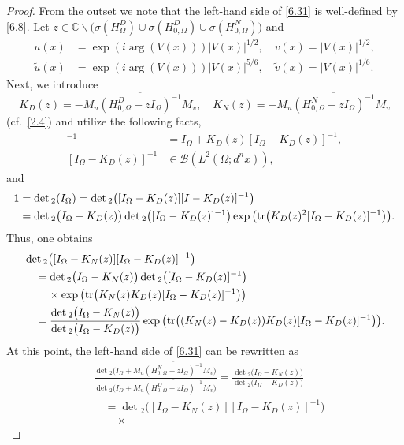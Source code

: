 \documentclass[reqno,10pt, centertags]{amsart}
\newcommand{\bbC}{{\mathbb{C}}}
\newcommand{\cB}{{\mathcal B}}
\newcommand{\abs}[1]{\left\lvert#1\right\rvert}
\newcommand{\no}{\nonumber}
\newcommand{\ol}{\overline}
\newcommand{\wti}{\widetilde}
\newcommand{\si}{\sigma}
\newcommand{\Om}{\Omega}
\newcommand{\tr}{\text{\rm{tr}}}
\numberwithin{equation}{section}
\theoremstyle{definition}
\begin{document}
\begin{proof}
From the outset we note that the left-hand side of \eqref{6.31} is
well-defined by \eqref{6.8}. Let $z\in\bbC\backslash\big(\si(H_{\Om}^D)\cup
\si(H_{0,\Om}^D) \cup \si(H_{0,\Om}^N)\big)$ and
\begin{align}
u(x) &= \exp(i\arg(V(x)))\abs{V(x)}^{1/2},\quad
v(x)=\abs{V(x)}^{1/2},
\\
\wti u(x) &= \exp(i\arg(V(x)))\abs{V(x)}^{5/6},\quad \wti
v(x)=\abs{V(x)}^{1/6}.
\end{align}
Next, we introduce
\begin{equation}
K_D(z)=-\ol{M_u(H_{0,\Om}^D-zI_{\Om})^{-1}M_v}, \quad
K_N(z)=-\ol{M_u(H_{0,\Om}^N-zI_{\Om})^{-1}M_v}
\end{equation}
(cf.\ \eqref{2.4}) and utilize the following facts,
\begin{align}
[I_{\Om}-K_D(z)]^{-1} &= I_{\Om} + K_D(z)[I_{\Om}-K_D(z)]^{-1},
\\
[I_{\Om}-K_D(z)]^{-1} &\in\cB(L^2(\Om;d^nx)),
\end{align}
and
\begin{align}
1& = \det{}_2(I_{\Om}) = \det{}_2\big([I_{\Om}-K_D(z)][I-K_D(z)]^{-1}\big)
\\
&= \det{}_2\big(I_{\Om}-K_D(z)\big)\det{}_2\big([I_{\Om}-K_D(z)]^{-1}\big)
\exp\big(\tr\big(K_D(z)^2[I_{\Om}-K_D(z)]^{-1}\big)\big).  \no
\end{align}
Thus, one obtains
\begin{align}
&\det{}_2\big([I_{\Om}-K_N(z)][I_{\Om}-K_D(z)]^{-1}\big)  \no \\
&\quad = \det{}_2\big(I_{\Om}-K_N(z)\big)
\det{}_2\big([I_{\Om}-K_D(z)]^{-1}\big) \no \\
& \qquad \, \times
\exp\big(\tr\big(K_N(z)K_D(z)[I_{\Om}-K_D(z)]^{-1}\big)\big) \\
&\quad =
\frac{\det{}_2\big(I_{\Om}-K_N(z)\big)}{\det{}_2\big(I_{\Om}-K_D(z)\big)}
\exp\big(\tr\big((K_N(z)-K_D(z))K_D(z)[I_{\Om}-K_D(z)]^{-1}\big)\big). \no
\end{align}
At this point, the left-hand side of \eqref{6.31} can be rewritten as
\begin{align}
&\frac{\det{}_2\big(I_{\Om}+\ol{M_u(H_{0,\Om}^N-zI_{\Om})^{-1}M_v}\big)}
{\det{}_2\big(I_{\Om}+\ol{M_u(H_{0,\Om}^D-zI_{\Om})^{-1}M_v}\big)} =
\frac{\det{}_2\big(I_{\Om}-K_N(z)\big)}{\det{}_2\big(I_{\Om}-K_D(z)\big)}
\no \\
&\quad = \det{}_2\big([I_{\Om}-K_N(z)][I_{\Om}-K_D(z)]^{-1}\big)
\no \\
&\quad\quad \, \times

\end{align}
\end{proof}
\end{document}
